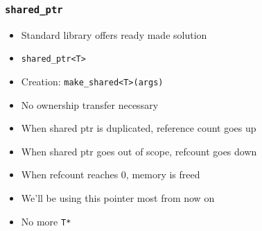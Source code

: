 \begin{frame}
  \frametitle{\tt shared\_ptr}
  \begin{itemize}
    \item Standard library offers ready made solution
    \item {\tt shared\_ptr<T>}
    \item Creation: {\tt make\_shared<T>(args)}
    \item No ownership transfer necessary
    \item When shared ptr is duplicated, reference count goes up
    \item When shared ptr goes out of scope, refcount goes down
    \item When refcount reaches 0, memory is freed
    \item We'll be using this pointer most from now on
    \item No more {\tt T*}
  \end{itemize}
\end{frame}




